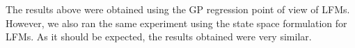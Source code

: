 \documentclass[journal]{IEEEtran}
\newcommand{\simo}[1]{{\color{red}#1}}
\begin{document}
The results above were obtained using the GP regression point of view of LFMs. However, we also ran the same experiment
using the state space formulation for LFMs. As it should be expected, the results obtained were very similar. 













\end{document}

